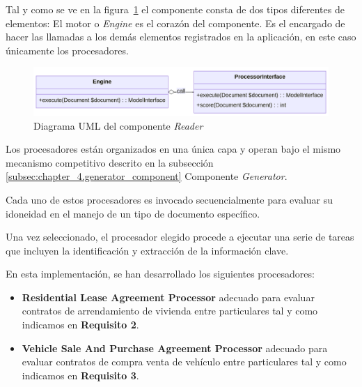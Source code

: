 Tal y como se ve en la figura~\ref{fig:chapter_4.1.reader_component_uml} el componente consta de dos tipos diferentes de
elementos: El motor o \textit{Engine} es el corazón del componente.
Es el encargado de hacer las llamadas a los demás elementos registrados en la aplicación, en este caso únicamente los
procesadores.

\begin{figure}[ht]
    \begin{center}
        \includegraphics[width=\textwidth]{./chapter/4/images/chapter_4.1.reader_component_uml}
        \caption{Diagrama UML del componente \textit{Reader}}
        \label{fig:chapter_4.1.reader_component_uml}
    \end{center}
\end{figure}

Los procesadores están organizados en una única capa y operan bajo el mismo mecanismo competitivo descrito en la
subsección \ref{subsec:chapter_4.generator_component} Componente \textit{Generator}.

Cada uno de estos procesadores es invocado secuencialmente para evaluar su idoneidad en el manejo de un tipo de
documento específico.

Una vez seleccionado, el procesador elegido procede a ejecutar una serie de tareas que incluyen la identificación y
extracción de la información clave.

En esta implementación, se han desarrollado los siguientes procesadores:

\begin{itemize}
    \item \textbf{Residential Lease Agreement Processor} adecuado para evaluar contratos de arrendamiento de
    vivienda entre particulares tal y como indicamos en \textbf{Requisito 2}.

    \item \textbf{Vehicle Sale And Purchase Agreement Processor} adecuado para evaluar contratos de compra venta de
    vehículo entre particulares tal y como indicamos en \textbf{Requisito 3}.
\end{itemize}
